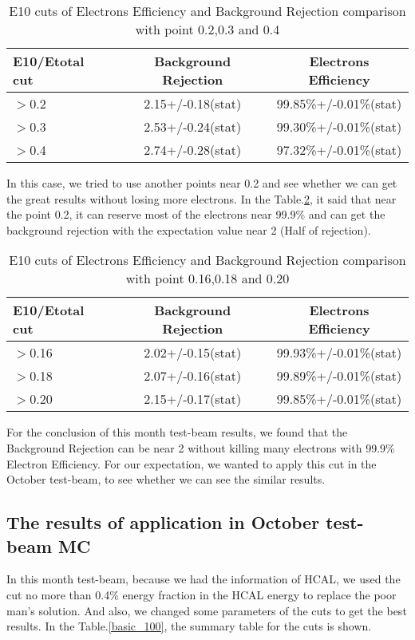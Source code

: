 \documentclass[12pt,twoside,a4paper,an,final]{cms-tdr}
\begin{document}
\begin{table}[h]%
    \centering
    \begin{tabular}{|l|c|c|}
    \hline
    E10/Etotal cut  & Background Rejection  &  Electrons Efficiency\\\hline
    $>$0.2 & 2.15+/-0.18(stat)   & 99.85\%+/-0.01\%(stat) \\\hline
    $>$0.3 & 2.53+/-0.24(stat)   & 99.30\%+/-0.01\%(stat) \\\hline
    $>$0.4 & 2.74+/-0.28(stat)   & 97.32\%+/-0.01\%(stat) \\\hline
    \end{tabular}
    \caption{E10 cuts of Electrons Efficiency and Background Rejection comparison with point 0.2,0.3 and 0.4}\label{basic_10}  %
\end{table}

In this case, we tried to use another points near 0.2 and see whether we can get the great results without losing more electrons. In the Table.\ref{basic_20}, it said that near the point 0.2, it can reserve most of the electrons near 99.9\% and can get the background rejection with the expectation value near 2 (Half of rejection). 

\begin{table}[h]%
    \centering
    \begin{tabular}{|l|c|c|}
    \hline
    E10/Etotal cut  & Background Rejection  &  Electrons Efficiency\\\hline
    $>$0.16 & 2.02+/-0.15(stat)   & 99.93\%+/-0.01\%(stat) \\\hline
    $>$0.18 & 2.07+/-0.16(stat)   & 99.89\%+/-0.01\%(stat) \\\hline
    $>$0.20 & 2.15+/-0.17(stat)   & 99.85\%+/-0.01\%(stat) \\\hline
    \end{tabular}
    \caption{E10 cuts of Electrons Efficiency and Background Rejection comparison with point 0.16,0.18 and 0.20}\label{basic_20}  %
\end{table}

For the conclusion of this month test-beam results, we found that the Background Rejection can be near 2 without killing many electrons with 99.9\% Electron Efficiency. For our expectation, we wanted to apply this cut in the October test-beam, to see whether we can see the similar results. 

\subsection{The results of application in October test-beam MC}
In this month test-beam, because we had the information of HCAL, we used the cut no more than 0.4\% energy fraction in the HCAL energy to replace the poor man's solution. And also, we changed some parameters of the cuts to get the best results. In the Table.\ref{basic_100}, the summary table for the cuts is shown.
\end{document}
